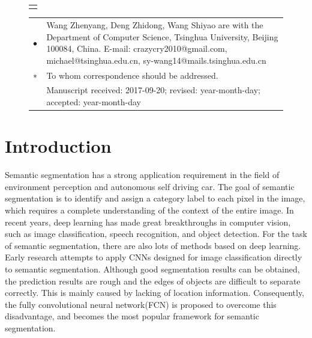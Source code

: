 \documentclass[10.5pt,compsoc]{TsT}
\newcommand{\upcite}[1]{\superscript{\textsuperscript{\cite{#1}}}}
\theoremstyle{mystyle}
\newcommand{\upcite}[1]{\textsuperscript{\cite{#1}}}
\begin{document}
{\begin{strip}
{\begin{tabular}{p{160mm}}
\end{tabular}
}
\vskip 6mm

\vskip -3mm
\end{strip}


\thispagestyle{plain}%
\thispagestyle{empty}%
\makeatother
\pagestyle{tstheadings}

\begin{figure}[b]
\vskip -6mm
\begin{tabular}{p{44mm}}
\toprule\\
\end{tabular}
\vskip -4.5mm
\noindent
\setlength{\tabcolsep}{1pt}
\begin{tabular}{p{1.5mm}p{79.5mm}}
$\bullet$& Wang Zhenyang, Deng Zhidong, Wang Shiyao are with the Department of Computer Science, Tsinghua University, Beijing 100084, China. E-mail: crazycry2010@gmail.com, michael@tsinghua.edu.cn, sy-wang14@mails.tsinghua.edu.cn \\
$\sf{*}$&
To whom correspondence should be addressed. \\
          &          Manuscript received: 2017-09-20; revised: year-month-day; accepted: year-month-day

\end{tabular}
\end{figure}



\section{Introduction}
\label{s:introduction}
\noindent

Semantic segmentation has a strong application requirement in the field of environment perception and autonomous self driving car. The goal of semantic segmentation is to identify and assign a category label to each pixel in the image, which requires a complete understanding of the context of the entire image. In recent years, deep learning has made great breakthroughs in computer vision, such as image classification\upcite{1}, speech recognition\upcite{2}, and object detection\upcite{3}. For the task of semantic segmentation, there are also lots of methods based on deep learning. Early research attempts to apply CNNs designed for image classification directly to semantic segmentation. Although good segmentation results can be obtained, the prediction results are rough and the edges of objects are difficult to separate correctly. This is mainly caused by lacking of location information. Consequently, the fully convolutional neural network(FCN)\upcite{4} is proposed to overcome this disadvantage, and becomes the most popular framework for semantic segmentation.

}
\end{document}
